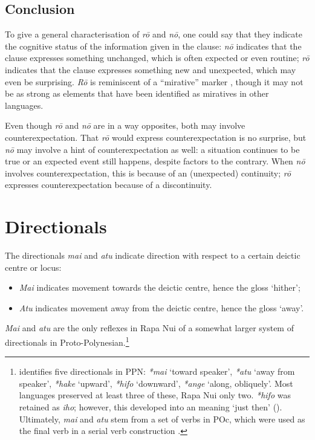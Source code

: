 \subsection{Conclusion}\label{sec:7.4.3}

To give a general characterisation of \textit{rō} and \textit{nō}, one could say that they indicate the cognitive status of the information given in the clause: \textit{nō} indicates that the clause expresses something unchanged, which is often expected or even routine; \textit{rō} indicates that the clause expresses something new and unexpected, which may even be surprising. \textit{Rō} is reminiscent of a “mirative” marker \citep[255]{Payne1997}, though it may not be as strong as elements that have been identified as miratives in other languages.

Even though \textit{rō} and \textit{nō} are in a way opposites, both may involve counterexpectation. That \textit{rō} would express counterexpectation is no surprise, but \textit{nō} may involve a hint of counterexpectation as well: a situation continues to be true or an expected event still happens, despite factors to the contrary. When \textit{nō} involves counterexpectation, this is because of an (unexpected) continuity; \textit{rō} expresses counterexpectation because of a discontinuity.

\section{Directionals}\label{sec:7.5}
The directionals \textit{mai} and \textit{atu} indicate direction with respect to a certain deictic centre or locus:

\newpage 
\begin{itemize}
\item 
\textit{Mai} indicates movement towards the deictic centre, hence the gloss ‘hither’;

\item 
\textit{Atu} indicates movement away from the deictic centre, hence the gloss ‘away’.

\end{itemize}

\textit{Mai} and \textit{atu} are the only reflexes in Rapa Nui of a somewhat larger system of directionals in Proto-Polynesian.\footnote{\label{fn:350}\citet[34]{Clark1976} identifies five directionals in PPN: \textit{*mai} ‘toward speaker’, \textit{*atu} ‘away from speaker’, \textit{*hake} ‘upward’, \textit{*hifo} ‘downward’, \textit{*ange} ‘along, obliquely’. Most languages preserved at least three of these, Rapa Nui only two. \textit{*hifo} was retained as \textit{iho}; however, this developed into an  meaning ‘just then’ ().
Ultimately, \textit{mai} and \textit{atu} stem from a set of  verbs in POc, which were used as the final verb in a serial verb construction \citep[194]{Ross2004}.} 

